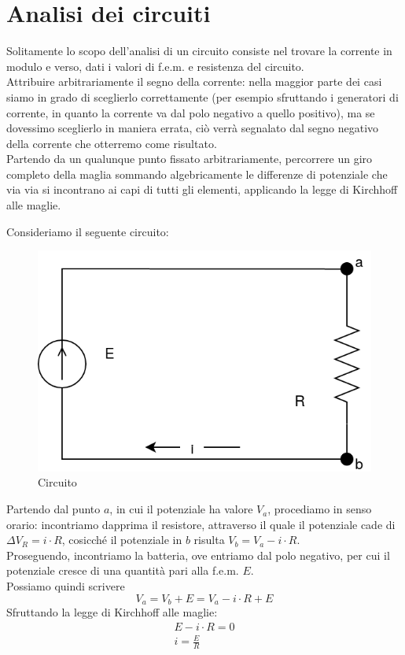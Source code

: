 \section{Analisi dei circuiti}
Solitamente lo scopo dell'analisi di un circuito consiste nel trovare la corrente in modulo e verso, dati i valori di f.e.m. e resistenza del circuito.\\
Attribuire arbitrariamente il segno della corrente: nella maggior parte dei casi siamo in grado di sceglierlo correttamente (per esempio sfruttando i generatori di corrente, in quanto la corrente va dal polo negativo a quello positivo), ma se dovessimo sceglierlo in maniera errata, ciò verrà segnalato dal segno negativo della corrente che otterremo come risultato.\\
Partendo da un qualunque punto fissato arbitrariamente, percorrere un giro completo della maglia sommando algebricamente le differenze di potenziale che via via si incontrano ai capi di tutti gli elementi, applicando la legge di Kirchhoff alle maglie.
\begin{esempio}
	Consideriamo il seguente circuito:
	\begin{figure}[h!]
		\centering
		\includegraphics[scale=0.4]{Pictures/circuito}
		\caption{Circuito}
	\end{figure}
	Partendo dal punto $a$, in cui il potenziale ha valore $V_a$, procediamo in senso orario: incontriamo dapprima il resistore, attraverso il quale il potenziale cade di $\Delta V_R = i\cdot R$, cosicché il potenziale in $b$ risulta $V_b = V_a - i\cdot R$.\\
	Proseguendo, incontriamo la batteria, ove entriamo dal polo negativo, per cui il potenziale cresce di una quantità pari alla f.e.m. $E$.\\
	Possiamo quindi scrivere
	\begin{displaymath}
		V_a = V_b + E = V_a - i \cdot R + E
	\end{displaymath}
	Sfruttando la legge di Kirchhoff alle maglie:
	\begin{displaymath}\begin{aligned}
		E - i \cdot R = 0\\
		i = \frac{E}{R}
	\end{aligned}\end{displaymath}
\end{esempio}

